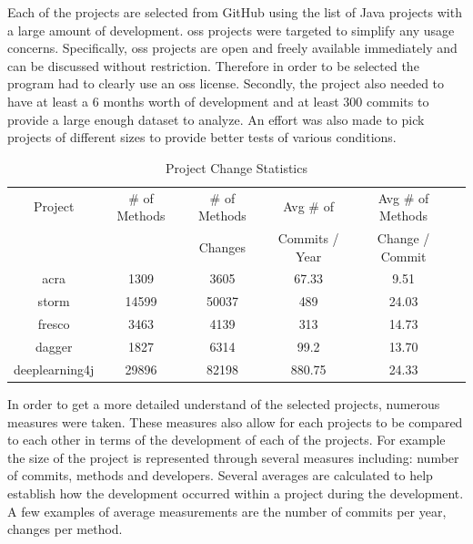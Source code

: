 Each of the projects are selected from GitHub using the list of Java projects with a large amount of development. \gls{oss} projects were targeted to simplify any usage concerns. Specifically, \gls{oss} projects are open and freely available immediately and can be discussed without restriction. Therefore in order to be selected the program had to clearly use an \gls{oss} license. Secondly, the project also needed to have at least a 6 months worth of development and at least 300 commits to provide a large enough dataset to analyze. An effort was also made to pick projects of different sizes to provide better tests of various conditions.

\begin{table}
\begin{center}
    \begin{tabular}{|c|c|c|c|c|c|}
        \hline
        Project & \# of Methods & \# of Methods & Avg \# of & Avg \# of Methods \\
         & & Changes & Commits / Year & Change / Commit \\
        \hline
        acra & 1309 & 3605 & 67.33 & 9.51 \\
        storm & 14599 & 50037 & 489 & 24.03 \\
        fresco & 3463 & 4139 & 313 & 14.73 \\
        dagger & 1827 & 6314 & 99.2 & 13.70 \\
        deeplearning4j & 29896 & 82198 & 880.75 & 24.33 \\
        \hline
    \end{tabular}
\end{center}
\caption{Project Change Statistics}
\label{tab:project_stats}
\end{table}

In order to get a more detailed understand of the selected projects, numerous measures were taken. These measures also allow for each projects to be compared to each other in terms of the development of each of the projects. For example the size of the project is represented through several measures including: number of commits, methods and developers. Several averages are calculated to help establish how the development occurred within a project during the development. A few examples of average measurements are the number of commits per year, changes per method.

